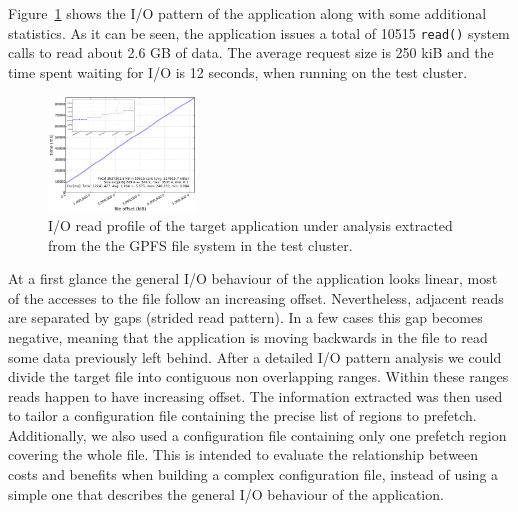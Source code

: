 \documentclass[conference]{IEEEtran}
\begin{document}
Figure~\ref{figure: iopattern_with_statistics} shows the I/O pattern of the application along with some additional statistics. As it can be seen, the application issues a total of 10515 \texttt{read()} system calls to read about 2.6 GB of data. The average request size is 250 kiB and the time spent waiting for I/O is 12 seconds, when running on the test cluster.
\begin{figure}[!htb]
  \centering
  \includegraphics[width=0.35\textwidth]{figures/iopat_profile}
  \caption{I/O read profile of the target application under analysis extracted from the the GPFS file system in the test cluster.}
  \label{figure: iopattern_with_statistics}
\end{figure}
At a first glance the general I/O behaviour of the application looks linear, most of the accesses to the file follow an increasing offset. Nevertheless, adjacent reads are separated by gaps (strided read pattern). In a few cases this gap becomes negative, meaning that the application is moving backwards in the file to read some data previously left behind. After a detailed I/O pattern analysis we could divide the target file into contiguous non overlapping ranges. Within these ranges reads happen to have increasing offset. The information extracted was then used to tailor a configuration file containing the precise list of regions to prefetch. Additionally, we also used a configuration file containing only one prefetch region covering the whole file. This is intended to evaluate the relationship between costs and benefits when building a complex configuration file, instead of using a simple one that describes the general I/O behaviour of the application. 
\end{document}
